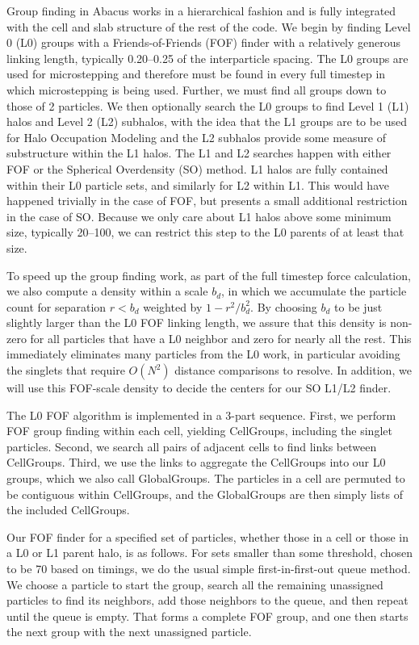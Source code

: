 Group finding in Abacus works in a hierarchical fashion and is fully
integrated with the cell and slab structure of the rest of the code.
We begin by finding Level 0 (L0) groups with a Friends-of-Friends
(FOF) finder with a relatively generous linking length, typically
0.20--0.25 of the interparticle spacing.  The L0 groups are used
for microstepping and therefore must be found in every full timestep
in which microstepping is being used.  Further, we must find all
groups down to those of 2 particles.  We then optionally search the
L0 groups to find Level 1 (L1) halos and Level 2 (L2) subhalos, with the
idea that the L1 groups are to be used for Halo Occupation Modeling
and the L2 subhalos provide some measure of substructure within the
L1 halos.  The L1 and L2 searches happen with either FOF or the
Spherical Overdensity (SO) method.  L1 halos are fully contained
within their L0 particle sets, and similarly for L2 within L1.  This
would have happened trivially in the case of FOF, but presents a
small additional restriction in the case of SO.  Because we only
care about L1 halos above some minimum size, typically 20--100, we
can restrict this step to the L0 parents of at least that size.

To speed up the group finding work, as part of the full timestep
force calculation, we also compute a density within a scale $b_d$,
in which we accumulate the particle count for separation $r<b_d$
weighted by $1-r^2/b_d^2$.  By choosing $b_d$ to be just slightly
larger than the L0 FOF linking length, we assure that this density
is non-zero for all particles that have a L0 neighbor and zero for
nearly all the rest.  This immediately eliminates many particles
from the L0 work, in particular avoiding the singlets that require
$O(N^2)$ distance comparisons to resolve.  In addition, we will use
this FOF-scale density to decide the centers for our SO L1/L2 finder.

The L0 FOF algorithm is implemented in a 3-part sequence.  First,
we perform FOF group finding within each cell, yielding CellGroups,
including the singlet particles.  Second, we search all pairs of
adjacent cells to find links between CellGroups.  Third, we use the
links to aggregate the CellGroups into our L0 groups, which we also
call GlobalGroups.  The particles in a cell are permuted to be
contiguous within CellGroups, and the GlobalGroups are then simply
lists of the included CellGroups.

Our FOF finder for a specified set of particles, whether those in a 
cell or those in a L0 or L1 parent halo, is as follows.  For sets smaller
than some threshold, chosen to be 70 based on timings, we do the 
usual simple first-in-first-out queue method.  We choose a particle
to start the group, search all the remaining unassigned particles to
find its neighbors, add those neighbors to the queue, and then repeat
until the queue is empty.  That forms a complete FOF group, and one
then starts the next group with the next unassigned particle.

